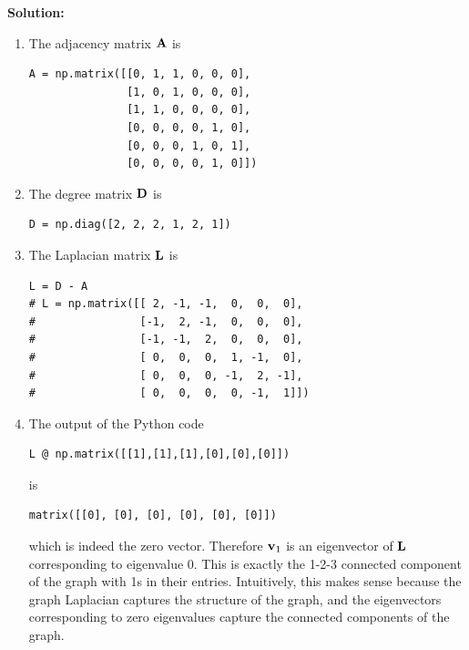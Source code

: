 \documentclass{article}
\newenvironment{solution}
{
\begin{oframed}
\noindent 
\smallskip \textbf{Solution:}\smallskip
}
{
\end{oframed}\par
}
\begin{document}
\newpage
\begin{solution}
\begin{enumerate}
    \item[1.] The adjacency matrix ${\bf A}$ is
\begin{center}
\begin{verbatim}
A = np.matrix([[0, 1, 1, 0, 0, 0],
               [1, 0, 1, 0, 0, 0],
               [1, 1, 0, 0, 0, 0],
               [0, 0, 0, 0, 1, 0],
               [0, 0, 0, 1, 0, 1],
               [0, 0, 0, 0, 1, 0]])
\end{verbatim}
\end{center}

    \item[2.] The degree matrix ${\bf D}$ is
\begin{center}
\begin{verbatim}
D = np.diag([2, 2, 2, 1, 2, 1])
\end{verbatim}
\end{center}

    \item[3.] The Laplacian matrix ${\bf L}$ is
\begin{center}
\begin{verbatim}
L = D - A
# L = np.matrix([[ 2, -1, -1,  0,  0,  0],
#                [-1,  2, -1,  0,  0,  0],
#                [-1, -1,  2,  0,  0,  0],
#                [ 0,  0,  0,  1, -1,  0],
#                [ 0,  0,  0, -1,  2, -1],
#                [ 0,  0,  0,  0, -1,  1]])
\end{verbatim}
\end{center}

    \item[4.] The output of the Python code
\begin{center}
\begin{verbatim}
L @ np.matrix([[1],[1],[1],[0],[0],[0]])
\end{verbatim}
\end{center}
is
\begin{center}
\begin{verbatim}
matrix([[0], [0], [0], [0], [0], [0]])
\end{verbatim}
\end{center}
which is indeed the zero vector. Therefore ${\bf v}_{1}$ is an eigenvector of ${\bf L}$ corresponding to eigenvalue 0. This is exactly the 1-2-3 connected component of the graph with 1s in their entries. Intuitively, this makes sense because the graph Laplacian captures the structure of the graph, and the eigenvectors corresponding to zero eigenvalues capture the connected components of the graph.


\end{enumerate}
\end{solution}
\end{document}
